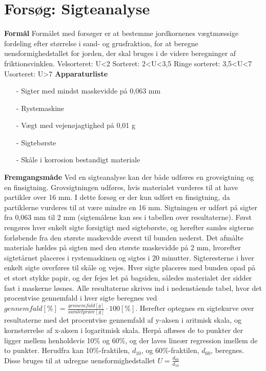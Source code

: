 \chapter{Forsøg: Sigteanalyse}
\textbf{Formål}
\newline
Formålet med forsøger er at bestemme jordkornenes vægtmæssige fordeling efter størrelse i sand- og grusfraktion, for at beregne uensformighedstallet for jorden, der skal bruges i de videre beregninger af friktionsvinklen. 
\newline
\newline
Velsorteret: U<2
\newline 
Sorteret: 2<U<3,5
\newline
Ringe sorteret: 3,5<U<7
\newline
Usorteret: U>7
\newline
\newline
\textbf{Apparaturliste}
\begin{itemize}
	\item[-] Sigter med mindst maskevidde på 0,063 mm
	\item[-] Rystemaskine
	\item[-] Vægt med vejenøjagtighed på 0,01 g
	\item[-] Sigtebørste
	\item[-] Skåle i korrosion bestandigt materiale
\end{itemize}
\textbf{Fremgangsmåde}
\newline
Ved en sigteanalyse kan der både udføres en grovsigtning og en finsigtning. Grovsigtningen udføres, hvis materialet vurderes til at have partikler over 16 mm. I dette forsøg er der kun udført en finsigtning, da partiklerne vurderes til at være mindre en 16 mm. Sigtningen er udført på sigter fra 0,063 mm til 2 mm (sigtemålene kan ses i tabellen over resultaterne). 
\newline \indent{     }   Først rengøres hver enkelt sigte forsigtigt med sigtebørste, og herefter samles sigterne forløbende fra den største maskevdde øverst til bunden nederst. Det afmålte materiale hældes på sigten med den største maskevidde på 2 mm, hvorefter sigtetårnet placeres i rystemaskinen og sigtes i 20 minutter.
\newline \indent{     }   Sigteresterne i hver enkelt sigte overføres til skåle og vejes. Hver sigte placeres med bunden opad på et stort stykke papir, og der fejes let på bagsiden, således materialet der sidder fast i maskerne løsnes.
\newline \indent{     }   Alle resultaterne skrives ind i nedenstående tabel, hvor det procentvise gennemfald i hver sigte beregnes ved $gennemfald [\%] = \frac{gennemfald [g]}{samlet prøve [g]}\cdot 100 [\%]$. Herefter optegnes en sigtekurve over resultaterne med det procentvise gennemfald af y-aksen i aritmisk skala, og kornstørrelse af x-aksen i logaritmisk skala. Herpå aflæses de to punkter der ligger mellem henholdsvis 10\% og 60\%, og der laves lineær regression imellem de to punkter. Herudfra kan 10\%-fraktilen, $d_{10}$, og 60\%-fraktilen, $d_{60}$, beregnes. Disse bruges til at udregne uensformighedstallet $U = \frac{d_{60}}{d_{10}}$
